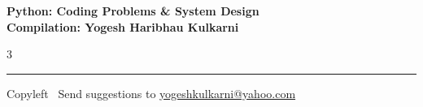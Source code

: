\documentclass[8pt,landscape]{article}
\begin{document}
\footnotesize


\begin{center}
\Large{\textbf{Python: Coding Problems \& System Design\\ Compilation: Yogesh Haribhau Kulkarni}}
\end{center}

\begin{multicols}{3}

\end{multicols}

\rule{\linewidth}{0.25pt}
\scriptsize
Copyleft \textcopyleft\  Send suggestions to
\href{http://www.yogeshkulkarni.com}{yogeshkulkarni@yahoo.com}
\end{document}
